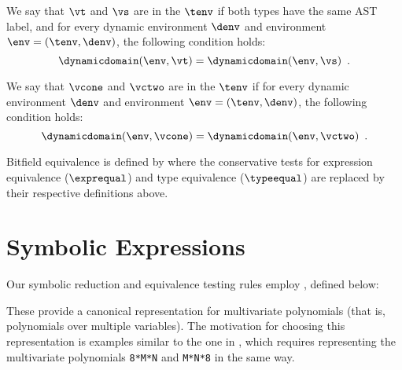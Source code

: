 \begin{definition}
\hypertarget{def-equivalenttypesterm}{}
We say that $\vt$ and $\vs$ are \emph{\equivalenttypesterm{}} in the \staticenvironmentterm{} $\tenv$
if both types have the same AST label,
and for every dynamic environment $\denv$
and environment $\env = (\tenv, \denv)$, the following condition holds:
\[
\dynamicdomain(\env, \vt) = \dynamicdomain(\env, \vs) \enspace.
\]
\end{definition}

\begin{definition}
\hypertarget{def-equivalentconstraintsterm}{}
We say that $\vcone$ and $\vctwo$ are \emph{\equivalentconstraintsterm{}} in the \staticenvironmentterm{} $\tenv$
if for every dynamic environment $\denv$
and environment $\env = (\tenv, \denv)$, the following condition holds:
\[
\dynamicdomain(\env, \vcone) = \dynamicdomain(\env, \vctwo) \enspace.
\]
\end{definition}

Bitfield equivalence is defined by  where
the conservative tests for expression equivalence ($\exprequal$)
and type equivalence ($\typeequal$) are replaced by their respective
definitions above.

\section{Symbolic Expressions\label{sec:symbolicexpressions}}
\hypertarget{def-symbolicexpressionterm}{}
Our symbolic reduction and equivalence testing rules employ \emph{\symbolicexpressionsterm}, defined below:
\hypertarget{type-Qnonzero}{}


These \symbolicexpressionsterm{} provide a canonical representation for multivariate polynomials
(that is, polynomials over multiple variables). The motivation for choosing this representation
is examples similar to the one in , which requires representing the
multivariate polynomials \verb|8*M*N| and \verb|M*N*8| in the same way.

